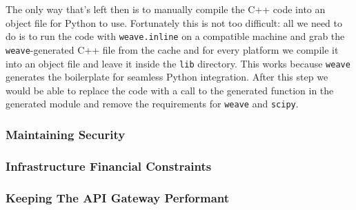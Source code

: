 The only way that's left then is to manually compile the C++ code into an object file for Python to use. Fortunately this is not too difficult: all we need to do is to run the code with \texttt{weave.inline} on a compatible machine and grab the \texttt{weave}-generated C++ file from the cache and for every platform we compile it into an object file and leave it inside the \texttt{lib} directory. This works because \texttt{weave} generates the boilerplate for seamless Python integration. After this step we would be able to replace the code with a call to the generated function in the generated module and remove the requirements for \texttt{weave} and \texttt{scipy}.

\subsubsection{Maintaining Security}


\subsubsection{Infrastructure Financial Constraints}


\subsubsection{Keeping The API Gateway Performant} 

